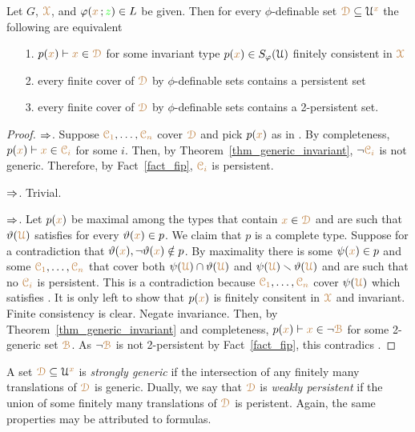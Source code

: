 \begin{theorem}\label{thm_generic_invariant2}
  Let $G$,  ${\color{brown}\EuScript X}$, and $\varphi({\color{brown} x}\,;{\color{green} z})\in L$ be given.
  Then for every $\phi$-definable set ${\color{brown}\EuScript D}\subseteq\EuScript U^{\color{brown} x}$ the following are equivalent 
  \begin{itemize}
    \item[1.] $p({\color{brown} x})\vdash{\color{brown}x}\in{\color{brown}\EuScript D}$ for some invariant type $p({\color{brown} x})\in S_\varphi(\EuScript U)$ finitely consistent in ${\color{brown}\EuScript X}$
    \item[2.] every finite cover of ${\color{brown}\EuScript D}$ by $\phi$-definable sets contains a persistent set
    \item[3.] every finite cover of ${\color{brown}\EuScript D}$ by $\phi$-definable sets contains a 2-persistent set.
  \end{itemize}
\end{theorem}

\begin{proof}
  $\Rightarrow$.
  Suppose ${\color{brown}\EuScript C_1},\dots,{\color{brown}\EuScript C_n}$ cover ${\color{brown}\EuScript D}$ and pick $p({\color{brown} x})$ as in .
  By completeness, $p({\color{brown} x})\vdash {\color{brown}x}\in{\color{brown}\EuScript C_i}$ for some $i$.
  Then, by Theorem~\ref{thm_generic_invariant}, $\neg{\color{brown}\EuScript C_i}$ is not generic.
  Therefore, by Fact~\ref{fact_fip}, ${\color{brown}\EuScript C_i}$ is persistent.
  
  $\Rightarrow$.
  Trivial.

  $\Rightarrow$.
  Let $p({\color{brown} x})$ be maximal among the types that contain ${\color{brown} x}\in{\color{brown}\EuScript D}$ and are such that $\vartheta({\color{brown}\EuScript U})$ satisfies  for every $\vartheta({\color{brown} x})\in p$.
  We claim that $p$ is a complete type.
  Suppose for a contradiction that $\vartheta({\color{brown} x}),\neg\vartheta({\color{brown} x})\notin p$.
  By maximality there is some $\psi({\color{brown} x})\in p$ and some ${\color{brown}\EuScript C_1},\dots,{\color{brown}\EuScript C_n}$ that cover both $\psi({\color{brown}\EuScript U})\cap\vartheta({\color{brown}\EuScript U})$ and $\psi({\color{brown}\EuScript U})\smallsetminus\vartheta({\color{brown}\EuScript U})$ and are such that no ${\color{brown}\EuScript C_i}$ is persistent.
  This is a contradiction because ${\color{brown}\EuScript C_1},\dots,{\color{brown}\EuScript C_n}$ cover $\psi({\color{brown}\EuScript U})$ which satisfies .
  It is only left to show that $p({\color{brown} x})$ is finitely consitent in ${\color{brown}\EuScript X}$ and invariant.
  Finite consistency is clear.
  Negate invariance.
  Then, by Theorem~\ref{thm_generic_invariant} and completeness, $p({\color{brown} x})\vdash {\color{brown}x}\in\neg{\color{brown}\EuScript B}$ for some 2-generic set ${\color{brown}\EuScript B}$.
  As $\neg{\color{brown}\EuScript B}$ is not 2-persistent by Fact~\ref{fact_fip}, this contradics .
\end{proof}

A set ${\color{brown}\EuScript D}\subseteq\EuScript U^{\color{brown} x}$ is \emph{strongly generic\/} if the intersection of any finitely many translations of ${\color{brown}\EuScript D}$ is generic.
Dually, we say that ${\color{brown}\EuScript D}$ is \emph{weakly persistent\/} if the union of some finitely many translations of ${\color{brown}\EuScript D}$ is peristent.
Again, the same properties may be attributed to formulas.

